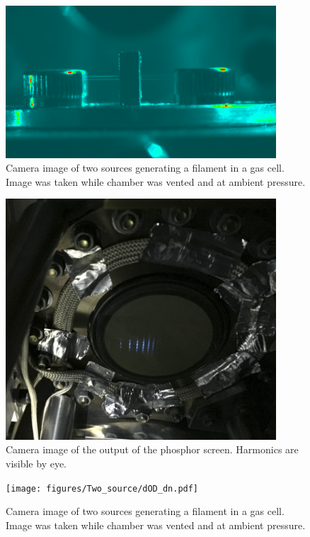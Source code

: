 \begin{figure}
	\centering
	\includegraphics[width=0.9\textwidth]{figures/Two_source/ts_filament_gas_cell.png}
	\caption{Camera image of two sources generating a filament in a gas cell. Image was taken while chamber was vented and at ambient pressure.}
	\label{my_anita}
\end{figure}

\lipsum

\begin{figure}
	\centering
	\includegraphics[width=0.9\textwidth]{figures/Two_source/MCP_ts_harmonics.png}
	\caption{Camera image of the output of the phosphor screen.  Harmonics are visible by eye.}
	\label{MCP_ts_harmonics}
\end{figure}

\lipsum

\begin{figure}
	\centering
	\texttt{[image: figures/Two\_source/dOD\_dn.pdf]}
	\caption{Camera image of two sources generating a filament in a gas cell. Image was taken while chamber was vented and at ambient pressure.}
	\label{my_anita}
\end{figure}

\lipsum